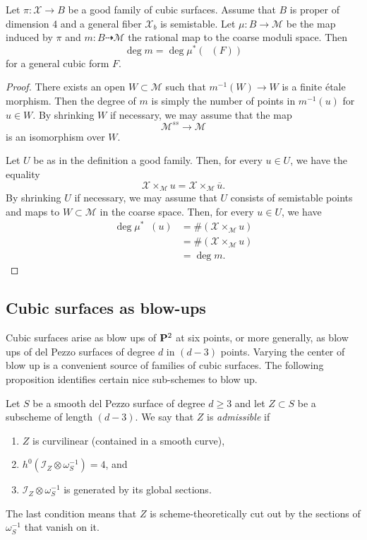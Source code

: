 \documentclass[12pt,reqno]{amsart}
\DeclareMathOperator{\Orb}{\overline{Orb}}
\renewcommand{\to}{{\longrightarrow}}
\numberwithin{equation}{section}
\newcommand{\cX}{\mathcal{X}}
\begin{document}
\begin{proposition}\label{prop:goodisgood}
  Let $\pi \colon \cX \to B$ be a good family of cubic surfaces.
  Assume that $B$ is proper of dimension 4 and a general fiber $\cX_b$ is semistable.
  Let $\mu \colon B \to \mathscr M$ be the map induced by $\pi$ and $m \colon B \dashrightarrow \mathcal M$ the rational map to the coarse moduli space.
  Then
  \[ \deg m = \deg \mu^*\left( \Orb(F) \right)\]
  for a general cubic form $F$.
\end{proposition}
\begin{proof}
  There exists an open $W \subset \mathcal M$ such that $m^{-1} (W) \to W$ is a finite \'etale morphism.
  Then the degree of $m$ is simply the number of points in $m^{-1}(u)$ for $u \in W$.
  By shrinking $W$ if necessary, we may assume that the map
  \[ \mathscr M^{ss} \to \mathcal M\]
  is an isomorphism over $W$.

  Let $U$ be as in the definition a good family.
  Then, for every $u \in U$, we have the equality
  \[ \cX \times_{\mathscr M} u = \cX \times_{\mathscr M} \overline u.\]
  By shrinking $U$ if necessary, we may assume that $U$ consists of semistable points and maps to $W \subset \mathcal M$ in the coarse space.
  Then, for every $u \in U$, we have
  \begin{align*}
    \deg \mu^* \Orb(u) &= \# \left(\cX \times_{\mathscr M} u \right)\\
                       &= \# \left(\cX \times_{\mathcal M} u\right) \\
                       &= \deg m.
  \end{align*}
\end{proof}

\subsection{Cubic surfaces as blow-ups}
Cubic surfaces arise as blow ups of $\P^2$ at six points, or more generally, as blow ups of del Pezzo surfaces of degree $d$ in $(d-3)$ points.
Varying the center of blow up is a convenient source of families of cubic surfaces.
The following proposition identifies certain nice sub-schemes to blow up.

\begin{definition}
  \label{def:admissible}
  Let $S$ be a smooth del Pezzo surface of degree $d \geq 3$ and let $Z \subset S$ be a subscheme of length $(d-3)$.
  We say that $Z$ is \emph{admissible} if 
  \begin{enumerate}
  \item $Z$ is curvilinear (contained in a smooth curve),
  \item $h^{0}\left(\mathcal{I}_Z \otimes \omega_S^{-1}\right) = 4$, and
  \item $\mathcal I_Z \otimes \omega_S^{-1}$ is generated by its global sections.
  \end{enumerate}
\end{definition}
The last condition means that $Z$ is scheme-theoretically cut out by the sections of $\omega_S^{-1}$ that vanish on it.
\end{document}
